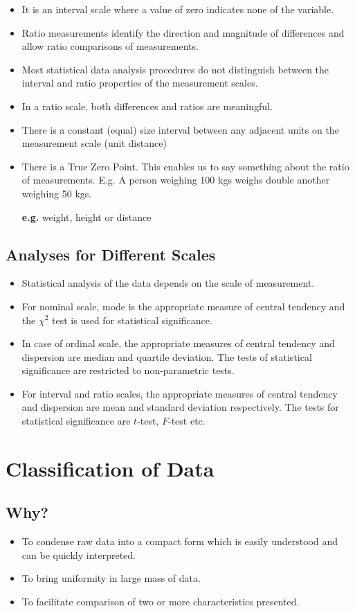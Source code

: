\documentclass[
10pt, %
a4paper, %
]{report}
\begin{document}
\begin{description}
\begin{itemize}
\item It is an interval scale where a value of zero indicates none of the variable.
\item Ratio measurements identify the direction and magnitude of differences and allow ratio comparisons of measurements.
\item Most statistical data analysis procedures do not distinguish between the interval and ratio properties of the measurement scales.
\item In a ratio scale, both differences and ratios are meaningful.
\item There is a constant (equal) size interval between any adjacent units on the measurement scale (unit distance)
\item There is a True Zero Point. This enables us to say something about the ratio of measurements. E.g. A person weighing 100 kgs weighs double another weighing 50 kgs.
\item[\textbf{e.g.}] weight, height or distance
\end{itemize}
\end{description}

\subsection*{Analyses for Different Scales}
\begin{itemize}
\item Statistical analysis of the data depends on the scale of measurement.
\item For nominal scale, mode is the appropriate measure of central tendency and the \(\chi^2\) test is used for statistical significance.
\item In case of ordinal scale, the appropriate measures of central tendency and dispersion are median and quartile deviation. The tests of statistical significance are restricted to non-parametric tests.
\item For interval and ratio scales, the appropriate measures of central tendency and dispersion are mean and standard deviation respectively. The tests for statistical significance are \(t\)-test, \(F\)-test etc.
\end{itemize}

\section*{Classification of Data}

\subsection*{Why?}
\begin{itemize}
\item To condense raw data into a compact form which is easily understood and can be quickly interpreted.
\item To bring uniformity in large mass of data.
\item To facilitate comparison of two or more characteristics presented.
\end{itemize}
\end{document}
